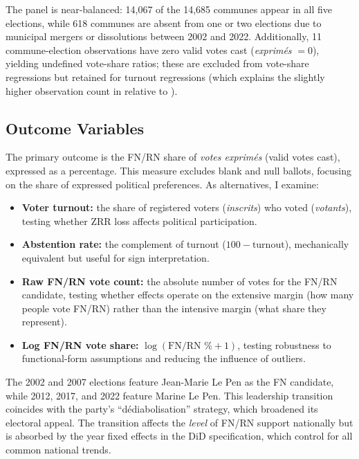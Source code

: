 \documentclass[12pt]{article}
\begin{document}
The panel is near-balanced: 14,067 of the 14,685 communes appear in all five elections, while 618 communes are absent from one or two elections due to municipal mergers or dissolutions between 2002 and 2022. Additionally, 11 commune-election observations have zero valid votes cast (\textit{exprim\'{e}s} $= 0$), yielding undefined vote-share ratios; these are excluded from vote-share regressions but retained for turnout regressions (which explains the slightly higher observation count in  relative to ).

\subsection{Outcome Variables}

The primary outcome is the FN/RN share of \textit{votes exprim\'{e}s} (valid votes cast), expressed as a percentage. This measure excludes blank and null ballots, focusing on the share of expressed political preferences. As alternatives, I examine:

\begin{itemize}
\item \textbf{Voter turnout:} the share of registered voters (\textit{inscrits}) who voted (\textit{votants}), testing whether ZRR loss affects political participation.
\item \textbf{Abstention rate:} the complement of turnout ($100 - \text{turnout}$), mechanically equivalent but useful for sign interpretation.
\item \textbf{Raw FN/RN vote count:} the absolute number of votes for the FN/RN candidate, testing whether effects operate on the extensive margin (how many people vote FN/RN) rather than the intensive margin (what share they represent).
\item \textbf{Log FN/RN vote share:} $\log(\text{FN/RN \%} + 1)$, testing robustness to functional-form assumptions and reducing the influence of outliers.
\end{itemize}

The 2002 and 2007 elections feature Jean-Marie Le Pen as the FN candidate, while 2012, 2017, and 2022 feature Marine Le Pen. This leadership transition coincides with the party's ``d\'{e}diabolisation'' strategy, which broadened its electoral appeal. The transition affects the \textit{level} of FN/RN support nationally but is absorbed by the year fixed effects in the DiD specification, which control for all common national trends.
\end{document}
